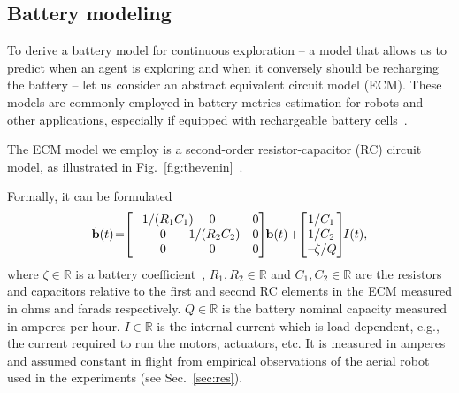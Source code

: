 \documentclass[letterpaper,10pt,conference,twoside]{IEEEtran}
\theoremstyle{definition}
\begin{document}
\subsection{Battery modeling}\label{sec:batt}
\noindent
To derive a battery model for continuous exploration -- a model that allows us to predict when an agent is exploring and when it conversely should be recharging the battery -- let us consider an abstract equivalent circuit model (ECM). These models are commonly employed in battery metrics estimation for robots and other applications, especially if equipped with rechargeable battery cells~\cite{zhang2018online,xiaosong2012comparative,hasan2018exogenous,hinz2019comparison,mousavi2014various,seewald2022energy}.

The ECM model we employ is a second-order resistor-capacitor (RC) circuit model, as illustrated in Fig.~\ref{fig:thevenin}~\cite{seewaldphdthesis}. 

Formally, it can be formulated~\cite{zhao2017observability}
\begin{equation}\label{eq:battmodel}
  \dot{\mathbf{b}}(t)\hspace*{-.4ex}=\hspace*{-.7ex}\begin{bmatrix}-1/(R_1C_1)\hspace*{-2ex}&\hspace*{-2ex}0&0\\\hspace*{2ex}0&\hspace*{-3ex}-1/(R_2C_2)&0\\\hspace*{2ex}0&\hspace*{-2ex}0&0\end{bmatrix}\hspace*{-.6ex}\mathbf{b}(t)\hspace*{-.2ex}+\hspace*{-.6ex}\begin{bmatrix}\hspace*{-.2ex}1/C_1\\\hspace*{-.2ex}1/C_2\\-\hspace*{-.4ex}\zeta/Q\end{bmatrix}\hspace*{-.7ex}I(t),
\end{equation}
where $\zeta\in\mathbb{R}$ is a battery coefficient~\cite{seewald2022energy}, $R_1,R_2\in\mathbb{R}$ and $C_1,C_2\in\mathbb{R}$ are the resistors and capacitors relative to the first and second RC elements in the ECM measured in ohms and farads respectively.
$Q\in\mathbb{R}$ is the battery nominal capacity measured in amperes per hour. 
%
$I\in\mathbb{R}$ is the internal current which is load-dependent, e.g., the current required to run the motors, actuators, etc. It is measured in amperes and assumed constant in flight from empirical observations of the aerial robot used in the experiments (see Sec.~\ref{sec:res}).
\end{document}
